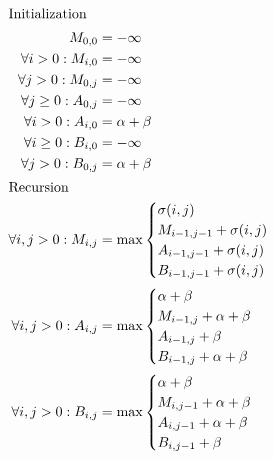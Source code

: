 \documentclass{article}
\begin{document}
%
\begin{align*}
  \intertext{Initialization}
%
  M_{0,0}  &= -\infty\\
  \forall i>0: M_{i,0} &= -\infty\\
  \forall j>0: M_{0,j} &= -\infty\\
%
  \forall j\geq 0: A_{0,j} &= -\infty\\
  \forall i>0: A_{i,0} &= \alpha+\beta\\
%
  \forall i\geq 0: B_{i,0} &= -\infty\\
  \forall j>0: B_{0,j} &= \alpha+\beta\\
%
  \intertext{Recursion}
  \forall i,j>0: M_{i,j} & = \max
  \begin{cases}
    \sigma(i,j) \\
    M_{i-1,j-1} + \sigma(i,j) \\
    A_{i-1,j-1} + \sigma(i,j) \\
    B_{i-1,j-1} + \sigma(i,j) \\
  \end{cases}
\\
  \forall i,j>0: A_{i,j} & = \max
  \begin{cases}
    \alpha+\beta \\
    M_{i-1,j} + \alpha + \beta \\
    A_{i-1,j} + \beta \\
    B_{i-1,j} + \alpha + \beta \\
  \end{cases}
\\
  \forall i,j>0: B_{i,j} & = \max
  \begin{cases}
    \alpha+\beta \\
    M_{i,j-1} + \alpha + \beta \\
    A_{i,j-1} + \alpha + \beta \\
    B_{i,j-1} + \beta \\
  \end{cases}
\end{align*}

\newpage
\end{document}
